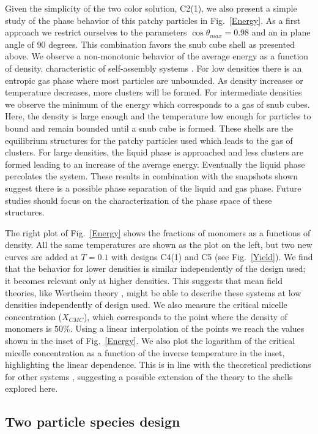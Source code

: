 \documentclass[a4paper, amsfonts, amssymb, amsmath, reprint, showkeys, nofootinbib, twoside]{revtex4-1}
\begin{document}
Given the simplicity of the two color solution, C2(1), we also present a simple study of the phase behavior of this patchy particles in Fig.~\ref{Energy}. As a first approach we restrict ourselves to the parameters $\cos\theta_{max}=0.98$ and an in plane angle of $90$ degrees. This combination favors the snub cube shell as presented above. We observe a non-monotonic behavior of the average energy as a function of density, characteristic of self-assembly systems \cite{Sciortino2009}. For low densities there is an entropic gas phase where most particles are unbounded. As density increases or temperature decreases, more clusters will be formed. For intermediate densities we observe the minimum of the energy which corresponds to a gas of snub cubes. Here, the density is large enough and the temperature low enough for particles to bound and remain bounded until a snub cube is formed. These shells are the equilibrium structures for the patchy particles used which leads to the gas of clusters. For large densities, the liquid phase is approached and less clusters are formed leading to an increase of the average energy. Eventually the liquid phase percolates the system. These results in combination with the snapshots shown suggest there is a possible phase separation of the liquid and gas phase. Future studies should focus on the characterization of the phase space of these structures.

The right plot of Fig.~\ref{Energy} shows the fractions of monomers as a functions of density. All the same temperatures are shown as the plot on the left, but two new curves are added at $T=0.1$ with designs C4(1) and C5 (see Fig.~\ref{Yield}). We find that the behavior for lower densities is similar independently of the design used; it becomes relevant only at higher densities. This suggests that mean field theories, like Wertheim theory \cite{Chapman1989}, might be able to describe these systems at low densities independently of design used. We also measure the critical micelle concentration ($X_{CMC}$), which corresponds to the point where the density of monomers is $50\%$. Using a linear interpolation of the points we reach the values shown in the inset of Fig.~\ref{Energy}. We also plot the logarithm of the critical micelle concentration as a function of the inverse temperature in the inset, highlighting the linear dependence. This is in line with the theoretical predictions for other systems \cite{israelachvili2011}, suggesting a possible extension of the theory to the shells explored here.

\subsection{Two particle species design}
\end{document}
